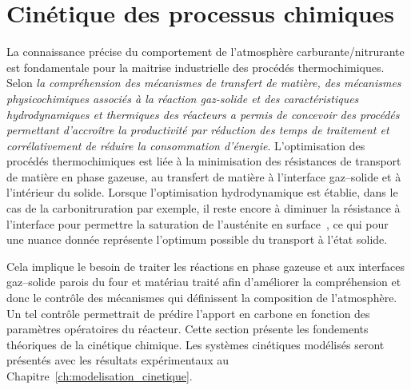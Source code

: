 \section{Cinétique des processus chimiques}
\label{sec:cinetique}

La connaissance précise du comportement de l'atmosphère carburante/nitrurante est fondamentale pour la maitrise industrielle des procédés thermochimiques.  Selon \citet{Dulcy2007} \og{}\textit{la compréhension des mécanismes de transfert de matière, des mécanismes physicochimiques associés à la réaction gaz-solide et des caractéristiques hydrodynamiques et thermiques des réacteurs a permis de concevoir des procédés permettant d'accroître la productivité par réduction des temps de traitement et corrélativement de réduire la consommation d'énergie}\fg{}.  L'optimisation des procédés thermochimiques est liée à la minimisation des résistances de transport de matière en phase gazeuse, au transfert de matière à l'interface gaz--solide et à l'intérieur du solide. Lorsque l'optimisation hydrodynamique est établie, dans le cas de la carbonitruration par exemple, il reste encore à diminuer la résistance à l'interface pour permettre la saturation de l'austénite en surface~\cite{Dulcy2007}, ce qui pour une nuance donnée représente l'optimum possible du transport à l'état solide.

Cela implique le besoin de traiter les réactions en phase gazeuse et aux interfaces gaz--solide \textendash{} parois du four et matériau traité \textendash{} afin d'améliorer la compréhension et donc le contrôle des mécanismes qui définissent la composition de l'atmosphère.  Un tel contrôle permettrait de prédire l'apport en carbone en fonction des paramètres opératoires du réacteur. Cette section présente les fondements théoriques de la cinétique chimique. Les systèmes cinétiques modélisés seront présentés avec les résultats expérimentaux au Chapitre~\ref{ch:modelisation_cinetique}.

